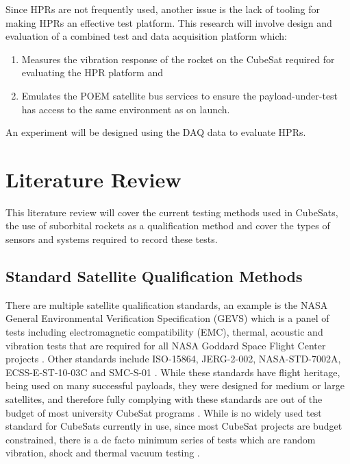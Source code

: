 \documentclass{report}
\begin{document}
Since HPRs are not frequently used, another issue is the lack of tooling for making HPRs an effective test platform. This research will involve design and evaluation of a combined test and data acquisition platform which:
\begin{enumerate}
  \item Measures the vibration response of the rocket on the CubeSat required for evaluating the HPR platform and
  \item Emulates the POEM satellite bus services to ensure the payload-under-test has access to the same environment as on launch.
\end{enumerate}

An experiment will be designed using the DAQ data to evaluate HPRs.

\chapter{Literature Review}

This literature review will cover the current testing methods used in CubeSats, the use of suborbital rockets as a qualification method and cover the types of sensors and systems required to record these tests.

\section{Standard Satellite Qualification Methods}
There are multiple satellite qualification standards, an example is the NASA General Environmental Verification Specification (GEVS) which is a panel of tests including electromagnetic compatibility (EMC), thermal, acoustic and vibration tests that are required for all NASA Goddard Space Flight Center projects \cite{nasa-gevs}. Other standards include ISO-15864, JERG-2-002, NASA-STD-7002A, ECSS-E-ST-10-03C and SMC-S-01 \cite{cho2012overview}. While these standards have flight heritage, being used on many successful payloads, they were designed for medium or large satellites, and therefore fully complying with these standards are out of the budget of most university CubeSat programs \cite{cho2012overview}. While is no widely used test standard for CubeSats currently in use, since most CubeSat projects are budget constrained, there is a de facto minimum series of tests which are random vibration, shock and thermal vacuum testing \cite{welle2020overview}.
\end{document}
